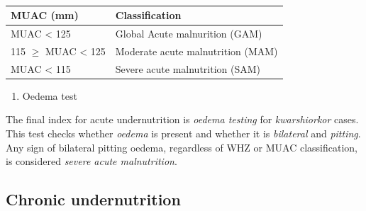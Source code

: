 \documentclass[12pt,]{book}
\providecommand{\tightlist}{%
  \setlength{\itemsep}{0pt}\setlength{\parskip}{0pt}}
\begin{document}
~

\begin{longtable}[]{@{}ll@{}}
\toprule
\begin{minipage}[b]{0.34\columnwidth}\raggedright
\textbf{MUAC (mm)}\strut
\end{minipage} & \begin{minipage}[b]{0.47\columnwidth}\raggedright
\textbf{Classification}\strut
\end{minipage}\tabularnewline
\midrule
\endhead
\begin{minipage}[t]{0.34\columnwidth}\raggedright
MUAC \textless{} 125\strut
\end{minipage} & \begin{minipage}[t]{0.47\columnwidth}\raggedright
Global Acute malnurition (GAM)\strut
\end{minipage}\tabularnewline
\begin{minipage}[t]{0.34\columnwidth}\raggedright
115 \(\geq\) MUAC \textless{} 125\strut
\end{minipage} & \begin{minipage}[t]{0.47\columnwidth}\raggedright
Moderate acute malnutrition (MAM)\strut
\end{minipage}\tabularnewline
\begin{minipage}[t]{0.34\columnwidth}\raggedright
MUAC \textless{} 115\strut
\end{minipage} & \begin{minipage}[t]{0.47\columnwidth}\raggedright
Severe acute malnutrition (SAM)\strut
\end{minipage}\tabularnewline
\bottomrule
\end{longtable}

\begin{enumerate}
\def\labelenumi{\arabic{enumi}.}
\setcounter{enumi}{2}
\tightlist
\item
  Oedema test
\end{enumerate}

The final index for acute undernutrition is \emph{oedema testing} for
\emph{kwarshiorkor} cases. This test checks whether \emph{oedema} is
present and whether it is \emph{bilateral} and \emph{pitting}. Any sign
of bilateral pitting oedema, regardless of WHZ or MUAC classification,
is considered \emph{severe acute malnutrition}.

\hypertarget{chronic-undernutrition}{%
\subsection{Chronic undernutrition}\label{chronic-undernutrition}}
\end{document}
